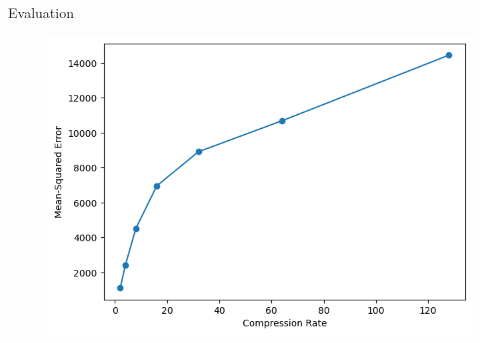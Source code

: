 \documentclass{beamer}
\begin{document}
\begin{frame}{Evaluation}
	\begin{figure}
			\centering
			\includegraphics[height=0.9\textheight]{./../../Images/mse.png}
	\end{figure}
\end{frame}
\end{document}

